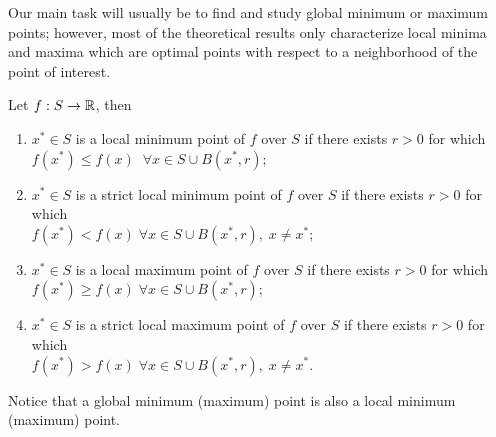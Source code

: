 \documentclass[10pt,a4paper]{article}
\begin{document}
Our main task will usually be to find and study global minimum or maximum points; however, most of the theoretical results only characterize local minima and maxima which are optimal points with respect to a neighborhood of the point of interest. 
\begin{definition} 
	Let $f:S\to \mathbb{R}$, then
	\begin{enumerate}
		\item $x^* \in S$ is a local minimum point of $f$ over $S$ if there exists $r>0$ for which \\$f(x^*)\leq f(x) \;\;\forall x \in S\cup B(x^*,r)$;
		\item $x^* \in S$ is a strict local minimum point of $f$ over $S$ if there exists $r>0$ for which \\$f(x^*)< f(x) \;\forall x \in S\cup B(x^*,r),\; x\neq x^*$;
		\item $x^* \in S$ is a local maximum point of $f$ over $S$ if there exists $r>0$ for which \\ $f(x^*)\geq f(x) \;\forall x \in S\cup B(x^*,r)$;
		\item $x^* \in S$ is a strict local maximum point of $f$ over $S$ if there exists $r>0$ for which \\ $f(x^*)> f(x) \;\forall x \in S\cup B(x^*,r),\; x\neq x^*$.
	\end{enumerate}
\end{definition}
Notice that a global minimum (maximum) point is also a local minimum (maximum) point.
\end{document}
